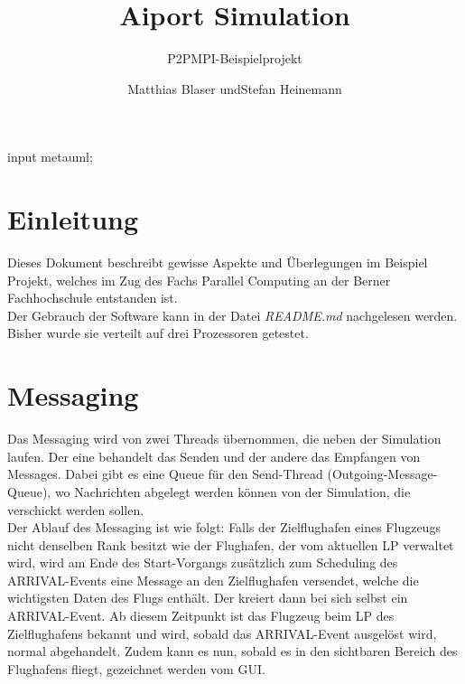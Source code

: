 \documentclass[oneside,DIV12,BCOR0.5cm,bibliography=totoc]{template}
\begin{document}
\begin{empfile}
\begin{empcmds}
input metauml;
\end{empcmds}


\title{Aiport Simulation}
\subtitle{P2PMPI-Beispielprojekt}

\author{Matthias Blaser undStefan Heinemann }

\maketitle


\section{Einleitung}

Dieses Dokument beschreibt gewisse Aspekte und Überlegungen im Beispiel
Projekt, welches im Zug des Fachs Parallel Computing an der Berner
Fachhochschule entstanden ist.\\

Der Gebrauch der Software kann in der Datei \emph{README.md} nachgelesen
werden. Bisher wurde sie verteilt auf drei Prozessoren getestet.

\section{Messaging}

Das Messaging wird von zwei Threads übernommen, die neben der Simulation
laufen. Der eine behandelt das Senden und der andere das Empfangen
von Messages. Dabei gibt es eine Queue für den Send-Thread 
(Outgoing-Message-Queue), wo Nachrichten abgelegt werden können von der
Simulation, die verschickt werden sollen.\\

Der Ablauf des Messaging ist wie folgt: Falls der Zielflughafen eines
Flugzeugs nicht denselben Rank besitzt wie der Flughafen, der vom
aktuellen LP verwaltet wird, wird am Ende des Start-Vorgangs zusätzlich
zum Scheduling des ARRIVAL-Events eine Message an den Zielflughafen
versendet, welche die wichtigsten Daten des Flugs enthält. Der kreiert
dann bei sich selbst ein ARRIVAL-Event. Ab diesem Zeitpunkt ist das
Flugzeug beim LP des Zielflughafens bekannt und wird, sobald das
ARRIVAL-Event ausgelöst wird, normal abgehandelt. Zudem kann es nun,
sobald es in den sichtbaren Bereich des Flughafens fliegt, gezeichnet
werden vom GUI.\\


\end{empfile}
\end{document}
